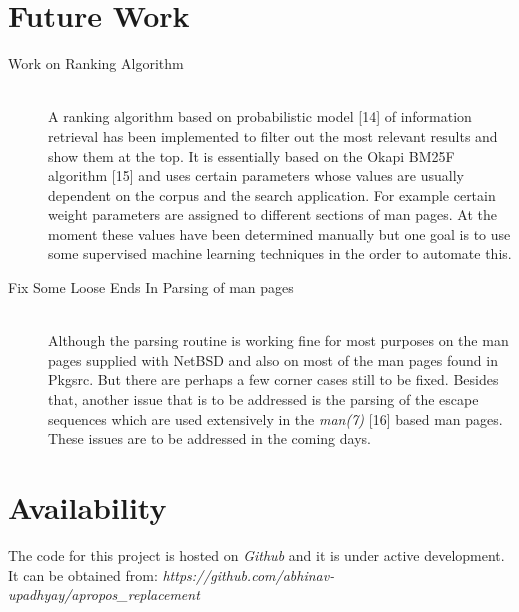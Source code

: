 \documentclass[titlepage, a4paper, 12pt]{article}
\begin{document}
\section{Future Work}
\begin{description}
\item[Work on Ranking Algorithm] \hfill \\
A ranking algorithm based on probabilistic model [14] of information
retrieval has been implemented to filter out the most relevant results and show
them at the top. It is essentially based on the Okapi BM25F algorithm [15] and
uses certain parameters whose values are usually dependent on the corpus and the
search application. For example certain weight parameters are assigned to
different sections of man pages. At the moment these values have been determined
manually but one goal is to use some supervised machine learning techniques in
the order to automate this.
\end{description}
\begin{description}
\item[Fix Some Loose Ends In Parsing of man pages] \hfill \\
Although the parsing routine is working fine for most purposes on the man pages
supplied with NetBSD and also on most of the man pages found in Pkgsrc. But there
are perhaps a few corner cases still to be fixed. Besides that, another issue
that
is to be addressed is the parsing of the escape sequences which are used
extensively in the \textit{man(7)} [16] based man pages. These issues are to be
addressed in the coming days.
\end{description}
\section{Availability}
The code for this project is hosted on \textit{Github} and it is under active development. It can be obtained from: \emph{https://github.com/abhinav-upadhyay/apropos\_replacement}
\end{document}
